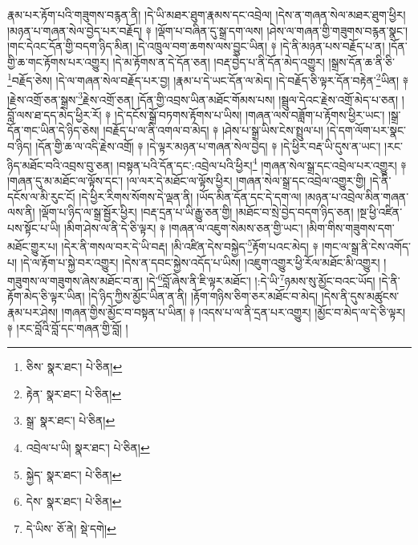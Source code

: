 རྣམ་པར་རྟོག་པའི་གཟུགས་བརྙན་ནི། །དེ་ཡི་མཐར་ཐུག་རྣམས་དང་འབྲེལ། །དེས་ན་གཞན་སེལ་མཐར་ཐུག་ཕྱིར། །མཉན་པ་གཞན་སེལ་བྱེད་པར་བརྗོད། ༈ །ལྡོག་པ་བཞིན་དུ་སྒྲ་དག་ལས། །ཤེས་ལ་གཞན་གྱི་གཟུགས་བརྙན་སྣང་། །གང་དེའང་དོན་གྱི་བདག་ཉིད་མིན། །དེ་འཁྲུལ་བག་ཆགས་ལས་བྱུང་ཡིན། ༈ །དེ་ནི་མཉན་པས་བརྗོད་པ་ན། །དོན་གྱི་ཆ་གང་རྟོགས་པར་འགྱུར། །དེ་མ་རྟོགས་ན་དེ་དོན་ཅན། །བརྡ་བྱེད་པ་ནི་དོན་མེད་འགྱུར། །སྒྲས་དོན་ཆ་ནི་ཅི་\footnote{ཅིས་  སྣར་ཐང་།  པེ་ཅིན། }བརྗོད་ཅེས། །དེ་ལ་གཞན་སེལ་བརྗོད་པར་བྱ། །རྣམ་པ་དེ་ཡང་དོན་ལ་མེད། །དེ་བརྗོད་ཅི་ལྟར་དོན་བརྟེན་\footnote{རྟེན་  སྣར་ཐང་།  པེ་ཅིན། }ཡིན། ༈ །རྗེས་འགྲོ་ཅན་སྒྲས་\footnote{སྒྲ་  སྣར་ཐང་།  པེ་ཅིན། }རྗེས་འགྲོ་ཅན། །དོན་གྱི་འབྲས་ཡིན་མཐོང་གོམས་པས། །སྦྲུལ་དེའང་རྗེས་འགྲོ་མེད་པ་ཅན། །བློ་ལས་ཐ་དད་མེད་ཕྱིར་རོ། ༈ །དེ་དངོས་སྒྲོ་བཏགས་རྟོགས་པ་ཡིས། །གཞན་ལས་བཟློག་པ་རྟོགས་ཕྱིར་ཡང་། །སྒྲ་དོན་གང་ཡིན་དེ་ཉིད་ཅེས། །བརྗོད་པ་ལ་ནི་འགལ་བ་མེད། ༈ །ཤེས་པ་སྒྲ་ཡིས་ངེས་སྤྲུལ་པ། །དེ་དག་ལོག་པར་སྣང་བ་ཉིད། །དོན་གྱི་ཆ་ལ་འདི་རྗེས་འགྲོ། ༈ །དེ་ལྟར་མཉན་པ་གཞན་སེལ་བྱེད། ༈ །དེ་ཕྱིར་བརྡ་ཡི་དུས་ན་ཡང་། །རང་ཉིད་མཐོང་བའི་འབྲས་བུ་ཅན། །བསྟན་པའི་དོན་དང་:འབྲེལ་པའི་ཕྱིར།\footnote{འབྲེལ་པ་ཡི།  སྣར་ཐང་།  པེ་ཅིན། } །གཞན་སེལ་སྒྲ་དང་འབྲེལ་པར་འགྱུར། ༈ །གཞན་དུ་མ་མཐོང་ལ་ལྟོས་དང་། །ལ་ལར་དེ་མཐོང་ལ་ལྟོས་ཕྱིར། །གཞན་སེལ་སྒྲ་དང་འབྲེལ་འགྱུར་གྱི། །དེ་ནི་དངོས་ལ་མི་རུང་ངོ། །དེ་ཕྱིར་རིགས་སོགས་དེ་ལྡན་ནི། །ཡོད་མིན་དོན་དང་དེ་དག་ལ། །མཉན་པ་འབྲེལ་མིན་གཞན་ལས་ནི། །ལྡོག་པ་ཉིད་ལ་སྒྲ་སྦྱོར་ཕྱིར། །བརྡ་དྲན་པ་ཡི་རྒྱུ་ཅན་གྱི། །མཐོང་བ་སྲེ་བྱེད་བདག་ཉིད་ཅན། །སྔ་ཕྱི་འཛིན་པས་སྟོང་པ་ཡི། །མིག་ཤེས་ལ་ནི་དེ་ཅི་ལྟར། ༈ །གཞན་ལ་འཇུག་སེམས་ཅན་གྱི་ཡང་། །མིག་གིས་གཟུགས་དག་མཐོང་གྱུར་པ། །དེར་ནི་གསལ་བར་དེ་ཡི་བརྡ། །མི་འཛིན་དེས་བསྐྱེད་\footnote{སྐྱེད་  སྣར་ཐང་།  པེ་ཅིན། }རྟོག་པའང་མེད། ༈ །གང་ལ་སྒྲ་ནི་ངེས་འགོད་པ། །དེ་ལ་རྟོག་པ་སྐྱེ་བར་འགྱུར། །དེས་ན་དབང་སྐྱེས་འདོད་པ་ཡིས། །འཇུག་འགྱུར་ཕྱི་རོལ་མཐོང་མི་འགྱུར། །གཟུགས་ལ་གཟུགས་ཞེས་མཐོང་བ་ན། །དེ་\footnote{དེས་  སྣར་ཐང་།  པེ་ཅིན། }བློ་ཞེས་ནི་ཇི་ལྟར་མཐོང་། །:དེ་ཡི་\footnote{དེ་ཡིས་  ཅོ་ནེ།  སྡེ་དགེ། }ཉམས་སུ་མྱོང་བའང་ཡོད། །དེ་ནི་རྟོག་མེད་ཅི་ལྟར་ཡིན། །དེ་ཉིད་ཀྱིས་མྱོང་ཡིན་ན་ནི། །རྟོག་གཉིས་ཅིག་ཅར་མཐོང་བ་མེད། །དེས་ནི་དུས་མཚུངས་རྣམ་པར་ཤེས། །གཞན་གྱིས་མྱོང་བ་བསྟན་པ་ཡིན། ༈ །འདས་པ་ལ་ནི་དྲན་པར་འགྱུར། །མྱོང་བ་མེད་ལ་དེ་ཅི་ལྟར། ༈ །རང་བློའི་བློ་དང་གཞན་གྱི་བློ། །

